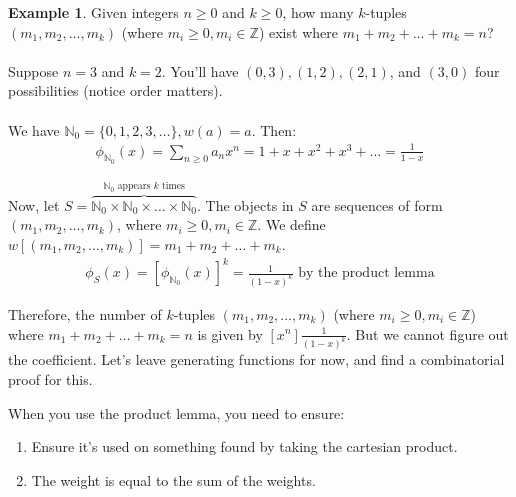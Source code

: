 \documentclass[]{article}
\theoremstyle{definition}
\newtheorem{ex}{Example}[section]
\begin{document}
				\begin{ex}
					Given integers $n \ge 0$ and $k \ge 0$, how many $k$-tuples $(m_1, m_2, \ldots, m_k)$ (where $m_i \ge 0, m_i \in \mathbb{Z}$) exist where $m_1 + m_2 + \ldots + m_k = n$?
					\\ \\
					Suppose $n = 3$ and $k = 2$. You'll have $(0, 3), (1, 2), (2, 1)$, and $(3, 0)$ \textendash{} four possibilities (notice order matters).
					\\ \\
					We have $\mathbb{N}_0 = \{0, 1, 2, 3, \ldots \}, w(a) = a$. Then:
					\begin{align*}
						\phi_{\mathbb{N}_0}(x) = \sum_{n \ge 0} a_n x^n = 1 + x + x^2 + x^3 + \ldots = \frac{1}{1-x}
					\end{align*}

					Now, let $S = \overbrace{\mathbb{N}_0 \times \mathbb{N}_0 \times \ldots \times \mathbb{N}_0}^{\mathbb{N}_0 \text{ appears } k \text{ times}}$. The objects in $S$ are sequences of form $(m_1, m_2, \ldots, m_k)$, where $m_i \ge 0, m_i \in \mathbb{Z}$. We define $w[(m_1, m_2, \ldots, m_k)] = m_1 + m_2 + \ldots + m_k$.
					\begin{align*}
						\phi_S(x) = [\phi_{\mathbb{N}_0}(x)]^k = \frac{1}{(1-x)^k} \text{ by the product lemma}
					\end{align*}

					Therefore, the number of $k$-tuples $(m_1, m_2, \ldots, m_k)$ (where $m_i \ge 0, m_i \in \mathbb{Z}$) where $m_1 + m_2 + \ldots + m_k = n$ is given by $[x^n]\frac{1}{(1 - x)^k}$. But we cannot figure out the coefficient. Let's leave generating functions for now, and find a combinatorial proof for this.
				\end{ex}

				When you use the product lemma, you need to ensure:
				\begin{enumerate}
					\item Ensure it's used on something found by taking the cartesian product.
					\item The weight is equal to the sum of the weights.
				\end{enumerate}
				
\end{document}
